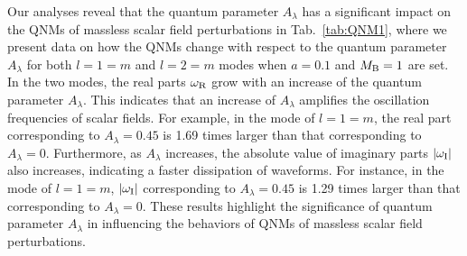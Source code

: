 \documentclass[12pt]{article}
\begin{document}
Our analyses reveal that the quantum parameter $A_\lambda$ has a significant impact on the QNMs of massless scalar field perturbations
in Tab.~\ref{tab:QNM1}, where we present data on how the QNMs change with respect to the quantum parameter $A_\lambda$ for both $l=1=m$ and $l=2=m$ modes when $a=0.1$ and $M_{\rm B}=1$ are set.
In the two modes, the real parts $\omega_{\rm R}$ grow with an increase of the quantum parameter $A_\lambda$. 
This indicates that an increase of $A_\lambda$ amplifies the oscillation frequencies of scalar fields. For example, 
in the mode of $l=1=m$, the real part corresponding to $A_\lambda=0.45$ is 1.69 times larger than that corresponding to $A_\lambda=0$.
Furthermore, as $A_\lambda$ increases, the absolute value of imaginary parts $|\omega_{\rm I}|$ also increases, indicating a faster dissipation of waveforms.
For instance, in the mode of $l=1=m$, $|\omega_{\rm I}|$ corresponding to $A_\lambda=0.45$ is 1.29 times larger than that corresponding to $A_\lambda=0$.
These results highlight the significance of quantum parameter $A_\lambda$ in influencing the behaviors of QNMs of massless scalar field perturbations. 
\end{document}
